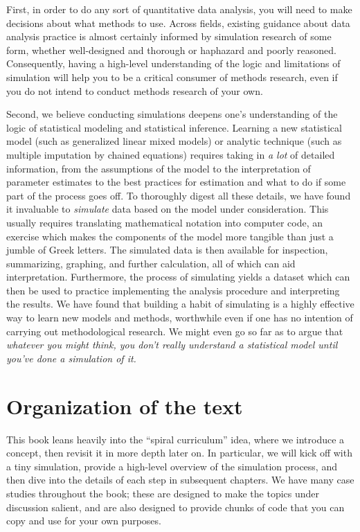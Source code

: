 \documentclass[
]{book}
\begin{document}
First, in order to do any sort of quantitative data analysis, you will need to make decisions about what methods to use.
Across fields, existing guidance about data analysis practice is almost certainly informed by simulation research of some form, whether well-designed and thorough or haphazard and poorly reasoned.
Consequently, having a high-level understanding of the logic and limitations of simulation will help you to be a critical consumer of methods research, even if you do not intend to conduct methods research of your own.

Second, we believe conducting simulations deepens one's understanding of the logic of statistical modeling and statistical inference.
Learning a new statistical model (such as generalized linear mixed models) or analytic technique (such as multiple imputation by chained equations) requires taking in \emph{a lot} of detailed information, from the assumptions of the model to the interpretation of parameter estimates to the best practices for estimation and what to do if some part of the process goes off.
To thoroughly digest all these details, we have found it invaluable to \emph{simulate} data based on the model under consideration.
This usually requires translating mathematical notation into computer code, an exercise which makes the components of the model more tangible than just a jumble of Greek letters.
The simulated data is then available for inspection, summarizing, graphing, and further calculation, all of which can aid interpretation.
Furthermore, the process of simulating yields a dataset which can then be used to practice implementing the analysis procedure and interpreting the results.
We have found that building a habit of simulating is a highly effective way to learn new models and methods, worthwhile even if one has no intention of carrying out methodological research.
We might even go so far as to argue that \emph{whatever you might think, you don't really understand a statistical model until you've done a simulation of it.}

\section{Organization of the text}\label{organization-of-the-text}

This book leans heavily into the ``spiral curriculum'' idea, where we introduce a concept, then revisit it in more depth later on.
In particular, we will kick off with a tiny simulation, provide a high-level overview of the simulation process, and then dive into the details of each step in subsequent chapters.
We have many case studies throughout the book; these are designed to make the topics under discussion salient, and are also designed to provide chunks of code that you can copy and use for your own purposes.
\end{document}
